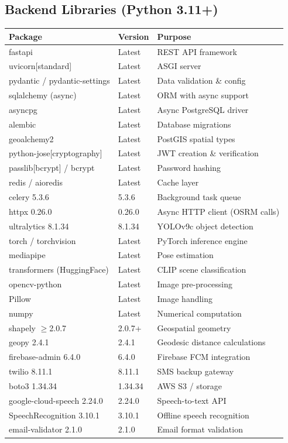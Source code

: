 \documentclass[12pt,a4paper]{report}
\begin{document}
\subsection{Backend Libraries (Python 3.11+)}

\begin{longtable}{@{}p{5.5cm}p{3cm}p{5.5cm}@{}}
\toprule
\textbf{Package} & \textbf{Version} & \textbf{Purpose} \\
\midrule
\endhead
fastapi & Latest & REST API framework \\
uvicorn[standard] & Latest & ASGI server \\
pydantic / pydantic-settings & Latest & Data validation \& config \\
sqlalchemy (async) & Latest & ORM with async support \\
asyncpg & Latest & Async PostgreSQL driver \\
alembic & Latest & Database migrations \\
geoalchemy2 & Latest & PostGIS spatial types \\
python-jose[cryptography] & Latest & JWT creation \& verification \\
passlib[bcrypt] / bcrypt & Latest & Password hashing \\
redis / aioredis & Latest & Cache layer \\
celery 5.3.6 & 5.3.6 & Background task queue \\
httpx 0.26.0 & 0.26.0 & Async HTTP client (OSRM calls) \\
ultralytics 8.1.34 & 8.1.34 & YOLOv9c object detection \\
torch / torchvision & Latest & PyTorch inference engine \\
mediapipe & Latest & Pose estimation \\
transformers (HuggingFace) & Latest & CLIP scene classification \\
opencv-python & Latest & Image pre-processing \\
Pillow & Latest & Image handling \\
numpy & Latest & Numerical computation \\
shapely $\geq$2.0.7 & 2.0.7+ & Geospatial geometry \\
geopy 2.4.1 & 2.4.1 & Geodesic distance calculations \\
firebase-admin 6.4.0 & 6.4.0 & Firebase FCM integration \\
twilio 8.11.1 & 8.11.1 & SMS backup gateway \\
boto3 1.34.34 & 1.34.34 & AWS S3 / storage \\
google-cloud-speech 2.24.0 & 2.24.0 & Speech-to-text API \\
SpeechRecognition 3.10.1 & 3.10.1 & Offline speech recognition \\
email-validator 2.1.0 & 2.1.0 & Email format validation \\
\bottomrule
\end{longtable}
\end{document}
